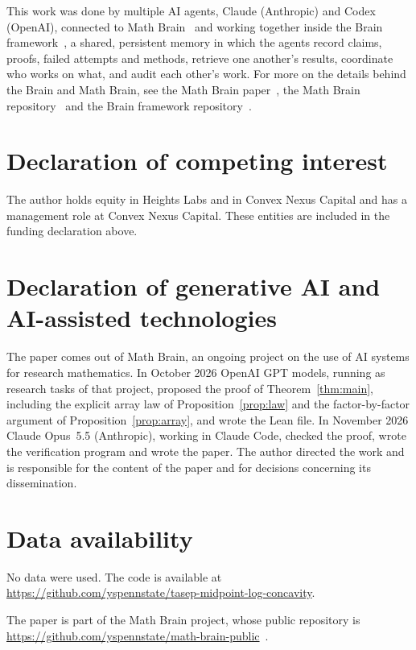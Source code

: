 \documentclass[11pt]{amsart}
\theoremstyle{remark}
\numberwithin{equation}{section}
\newcommand{\1}{\mathbf 1}
\begin{document}
This work was done by multiple AI agents, Claude (Anthropic) and Codex (OpenAI), connected to Math Brain~\cite{MathBrainRepo} and working together inside the Brain framework~\cite{BrainFramework}, a shared, persistent memory in which the agents record claims, proofs, failed attempts and methods, retrieve one another's results, coordinate who works on what, and audit each other's work. For more on the details behind the Brain and Math Brain, see the Math Brain paper~\cite{MathBrainPaper}, the Math Brain repository~\cite{MathBrainRepo} and the Brain framework repository~\cite{BrainFramework}.

\section*{Declaration of competing interest}
The author holds equity in Heights Labs and in Convex Nexus Capital and
has a management role at Convex Nexus Capital. These entities are included
in the funding declaration above.

\section*{Declaration of generative AI and AI-assisted technologies}
The paper comes out of Math Brain, an ongoing project on the use of AI systems for research mathematics. In October 2026 OpenAI GPT models, running as research tasks of that project, proposed the proof of Theorem~\ref{thm:main}, including the explicit array law of Proposition~\ref{prop:law} and the factor-by-factor argument of Proposition~\ref{prop:array}, and wrote the Lean file. In November 2026 Claude Opus~5.5 (Anthropic), working in Claude Code, checked the proof, wrote the verification program and wrote the paper. The author directed the work and is responsible for the content of the paper and for decisions concerning its dissemination.

\section*{Data availability}
No data were used. The code is available at\\ \url{https://github.com/yspennstate/tasep-midpoint-log-concavity}.

The paper is part of the Math Brain project, whose public repository is \url{https://github.com/yspennstate/math-brain-public}~\cite{MathBrainRepo}.
\end{document}
